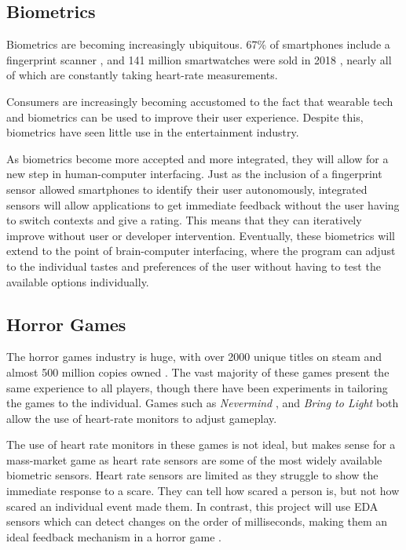 \documentclass[12pt,a4paper]{article}\usepackage[]{graphicx}\usepackage[]{color}
\begin{document}
\subsection{Biometrics}
Biometrics are becoming increasingly ubiquitous.
67\% of smartphones include a fingerprint scanner \citep{fingerprint}, and 141 million smartwatches were sold in 2018 \citep{smartwatches}, nearly all of which are constantly taking heart-rate measurements.

Consumers are increasingly becoming accustomed to the fact that wearable tech and biometrics can be used to improve their user experience.
Despite this, biometrics have seen little use in the entertainment industry.

As biometrics become more accepted and more integrated, they will allow for a new step in human-computer interfacing.
Just as the inclusion of a fingerprint sensor allowed smartphones to identify their user autonomously, integrated sensors will allow applications to get immediate feedback without the user having to switch contexts and give a rating.
This means that they can iteratively improve without user or developer intervention.
Eventually, these biometrics will extend to the point of brain-computer interfacing, where the program can adjust to the individual tastes and preferences of the user without having to test the available options individually.

\subsection{Horror Games}
The horror games industry is huge, with over 2000 unique titles on steam and almost 500 million copies owned \citep{horrorSteamSpy}.
The vast majority of these games present the same experience to all players, though there have been experiments in tailoring the games to the individual.
Games such as  \emph{Nevermind} \citep{nevermind}, and \emph{Bring to Light} \citep{bringtolight} both allow the use of heart-rate monitors to adjust gameplay.

The use of heart rate monitors in these games is not ideal, but makes sense for a mass-market game as heart rate sensors are some of the most widely available biometric sensors.
Heart rate sensors are limited as they struggle to show the immediate response to a scare.
They can tell how scared a person is, but not how scared an individual event made them.
In contrast, this project will use EDA sensors which can detect changes on the order of milliseconds, making them an ideal feedback mechanism in a horror game \citep{edaAnalysis}.
\end{document}
